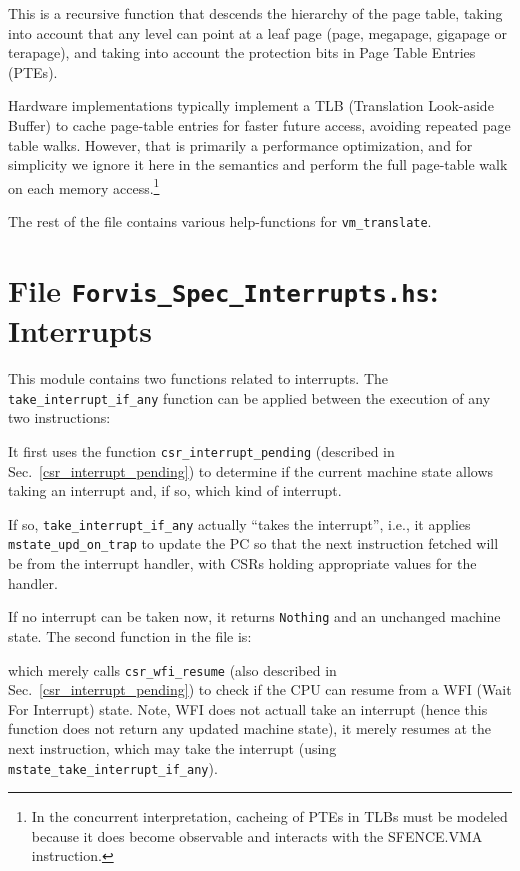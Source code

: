 \documentclass[11pt]{article}
\begin{document}


This is a recursive function that descends the hierarchy of the page
table, taking into account that any level can point at a leaf page
(page, megapage, gigapage or terapage), and taking into account the
protection bits in Page Table Entries (PTEs).

Hardware implementations typically implement a TLB (Translation
Look-aside Buffer) to cache page-table entries for faster future
access, avoiding repeated page table walks.  However, that is
primarily a performance optimization, and for simplicity we ignore it
here in the semantics and perform the full page-table walk on each
memory access.\footnote{In the concurrent interpretation, cacheing of
PTEs in TLBs must be modeled because it does become observable and
interacts with the SFENCE.VMA instruction.}

The rest of the file contains various help-functions for \verb|vm_translate|.


\section{File {\tt Forvis\_Spec\_Interrupts.hs}: Interrupts}

\label{sec_interrupts}

This module contains two functions related to interrupts.  The
\verb|take_interrupt_if_any| function can be applied between the
execution of any two instructions:



It first uses the function \verb|csr_interrupt_pending| (described in
Sec.~\ref{csr_interrupt_pending}) to determine if the current machine
state allows taking an interrupt and, if so, which kind of interrupt.

If so, \verb|take_interrupt_if_any| actually ``takes the interrupt'',
i.e., it applies \verb|mstate_upd_on_trap| to update the PC so that
the next instruction fetched will be from the interrupt handler, with
CSRs holding appropriate values for the handler.

If no interrupt can be taken now, it returns \verb|Nothing| and an
unchanged machine state.  The second function in the file is:



which merely calls \verb|csr_wfi_resume| (also described in
Sec.~\ref{csr_interrupt_pending}) to check if the CPU can resume from
a WFI (Wait For Interrupt) state.  Note, WFI does not actuall take an
interrupt (hence this function does not return any updated machine
state), it merely resumes at the next instruction, which may take the
interrupt (using \verb|mstate_take_interrupt_if_any|).
\end{document}
